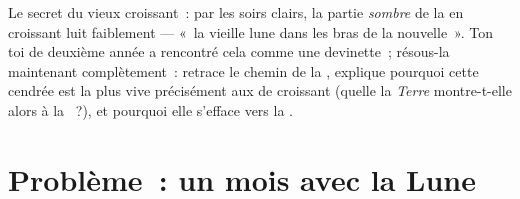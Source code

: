 \begin{exercise}[$\star\star\star$]\label{exo:g7:moon-phases:12}
Le secret du vieux croissant~: par les soirs clairs, la partie
\emph{sombre} de la  en croissant luit faiblement --- «~la
vieille lune dans les bras de la nouvelle~». Ton toi de deuxième
année a rencontré cela comme une devinette~; résous-la maintenant
complètement~: retrace le chemin de la , explique pourquoi
cette  cendrée est la plus vive précisément aux  de
croissant (quelle  la \emph{Terre} montre-t-elle alors à la
~?), et pourquoi elle s'efface vers la .
\end{exercise}

\section{Problème~: un mois avec la Lune}

